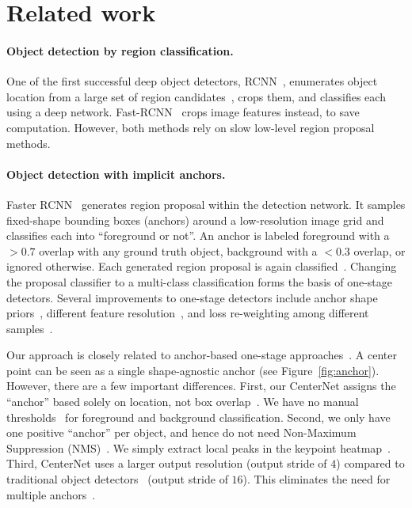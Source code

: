 \documentclass[10pt,twocolumn,letterpaper]{article}
\begin{document}
\section{Related work}

\paragraph{Object detection by region classification.}
One of the first successful deep object detectors, RCNN~\cite{girshick2014rich}, enumerates object location from a large set of region candidates~\cite{uijlings2013selective}, crops them, and classifies each using a deep network.
Fast-RCNN~\cite{girshick2015fast} crops image features instead, to save computation. 
However, both methods rely on slow low-level region proposal methods.



\paragraph{Object detection with implicit anchors.}
 
Faster RCNN~\cite{ren2015faster} generates region proposal within the detection network. 
It samples fixed-shape bounding boxes (anchors) around a low-resolution image grid and classifies each into ``foreground or not''.
An anchor is labeled foreground with a $>\!\!\!0.7$ overlap with any ground truth object, background with a $<\!\!\!0.3$ overlap, or ignored otherwise.
Each generated region proposal is again classified~\cite{girshick2015fast}.
Changing the proposal classifier to a multi-class classification forms the basis of one-stage detectors.
Several improvements to one-stage detectors include anchor shape priors~\cite{redmon2017yolo9000,redmon2018yolov3}, different feature resolution~\cite{liu2016ssd}, and loss re-weighting among different samples~\cite{lin2018focal}.

Our approach is closely related to anchor-based one-stage approaches~\cite{redmon2016you,liu2016ssd,lin2018focal}.
A center point can be seen as a single shape-agnostic anchor (see Figure~\ref{fig:anchor}).
However, there are a few important differences.
First, our CenterNet assigns the ``anchor'' based solely on location, not box overlap~\cite{girshick2015fast}.
We have no manual thresholds~\cite{girshick2015fast} for foreground and background classification.
Second, we only have one positive ``anchor'' per object, and hence do not need Non-Maximum Suppression (NMS)~\cite{bodla2017soft}.
We simply extract local peaks in the keypoint heatmap~\cite{newell2017associative,cao2017realtime}.
Third, CenterNet uses a larger output resolution (output stride of $4$) compared to traditional object detectors~\cite{he2016deep,he2017mask} (output stride of $16$).
This eliminates the need for multiple anchors~\cite{singh2018analysis}.
\end{document}
